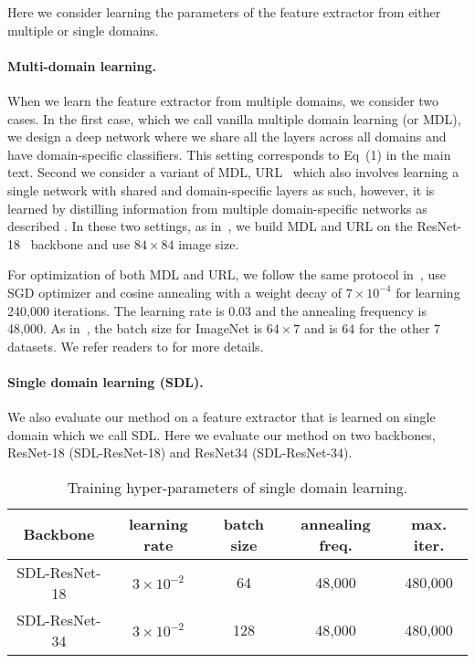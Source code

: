 Here we consider learning the parameters of the feature extractor from either multiple or single domains.





\paragraph{Multi-domain learning.}
When we learn the feature extractor from multiple domains, we consider two cases.
In the first case, which we call vanilla multiple domain learning (or MDL), we design a deep network where we share all the layers across all domains and have domain-specific classifiers.
This setting corresponds to Eq~(1) in the main text.
Second we consider a variant of MDL, URL~\cite{li2021universal} which also involves learning a single network with shared and domain-specific layers as such, however, it is learned by distilling information from multiple domain-specific networks as described \cite{li2021universal}.
In these two settings, as in~\cite{dvornik2020selecting,bateni2020improved,li2021universal}, we build  MDL and URL on the ResNet-18~\cite{he2016deep} backbone and use $84\times 84$ image size.



For optimization of both MDL and URL, we follow the same protocol in~\cite{li2021universal}, use SGD optimizer and cosine annealing with a weight decay of $7\times 10^{-4}$  for learning 240,000 iterations. The learning rate is 0.03 and the annealing frequency is 48,000. As in~\cite{li2021universal}, the batch size for ImageNet is $64\times 7$ and is $64$ for the other 7 datasets. We refer readers to \cite{li2021universal} for more details.





\paragraph{Single domain learning (SDL).}

We also evaluate our method on a feature extractor that is learned on single domain which we call SDL.
Here we evaluate our method on two backbones, ResNet-18 (SDL-ResNet-18) and ResNet34 (SDL-ResNet-34).


\begin{table}[h!]
	\centering
    \resizebox{1.0\textwidth}{!}
    {
		\begin{tabular}{ccccc}
		    \toprule
		    Backbone & learning rate & batch size & annealing freq. & max. iter. \\
		    \midrule
		    SDL-ResNet-18 & $3\times 10^{-2}$ & 64 & 48,000 & 480,000\\
		    SDL-ResNet-34 & $3\times 10^{-2}$ & 128 & 48,000 & 480,000\\
			\bottomrule
		\end{tabular}%
			}
		\vspace{-0.25cm}
		\caption{Training hyper-parameters of single domain learning.}
		\label{supptab:hyperparams}
\end{table}%



